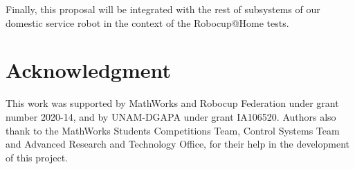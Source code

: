 \documentclass[conference,letterpaper]{ieeeconf}
\begin{document}
Finally, this proposal will be integrated with the rest of subsystems of our domestic service robot in the context of the Robocup@Home tests.

\section*{Acknowledgment}
This work was supported by MathWorks and Robocup Federation under grant number 2020-14, and by UNAM-DGAPA under grant IA106520. Authors also thank to the MathWorks Students Competitions Team, Control Systems Team and Advanced Research and Technology Office, for their help in the development of this project.




\end{document}
